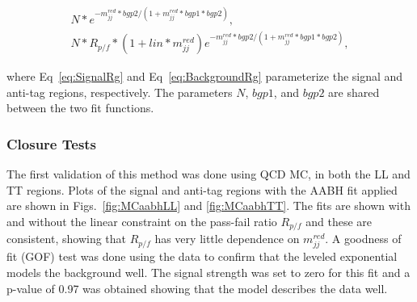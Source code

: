 \begin{gather}
N\ast e^{-m_{jj}^{red}\ast bgp2/(1+m_{jj}^{red}\ast bgp1\ast bgp2)}\label{eq:SignalRg},\\
N\ast R_{p/f}\ast(1+lin\ast m_{jj}^{red}) e^{-m_{jj}^{red}\ast bgp2/(1+m_{jj}^{red}\ast bgp1\ast bgp2)} \label{eq:BackgroundRg},
\end{gather}

\noindent
where Eq~\ref{eq:SignalRg} and Eq~\ref{eq:BackgroundRg} parameterize the signal and anti-tag regions, respectively. The parameters $N$, $bgp1$, and $bgp2$ are shared between the two fit functions. 


\subsubsection{Closure Tests}

The first validation of this method was done using QCD MC, in both the LL and TT regions. Plots of the signal and anti-tag regions with the AABH fit applied are shown in Figs.~\ref{fig:MCaabhLL} and \ref{fig:MCaabhTT}. The fits are shown with and without the linear constraint on the pass-fail ratio $R_{p/f}$ and these are consistent, showing that $R_{p/f}$ has very little dependence on $m_{jj}^{red}$. A goodness of fit (GOF) test was done using the data to confirm that the leveled exponential models the background well. The signal strength was set to zero for this fit and a p-value of 0.97 was obtained showing that the model describes the data well. 

